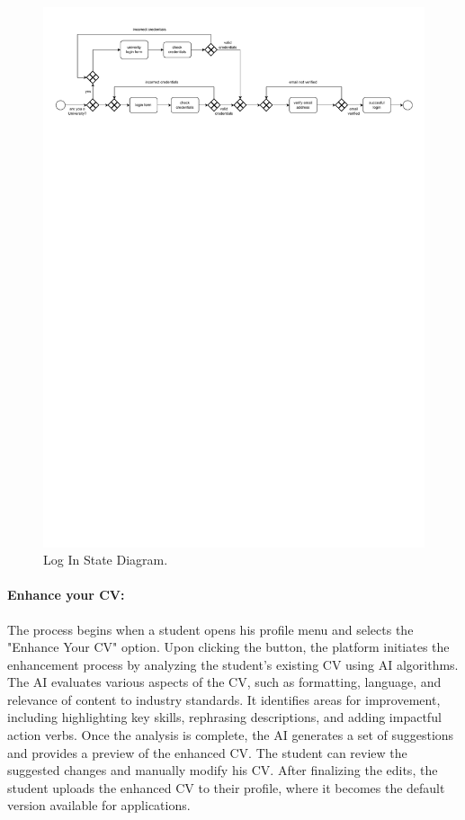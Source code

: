 \begin{figure}[H]
    \begin{center}
        \includegraphics[width=\linewidth]{Images/StateDiagram/Login.pdf}
        \caption{Log In State Diagram.}
        \label{fig:log_in_state_diag}%
    \end{center}
\end{figure}

\paragraph{Enhance your CV:} The process begins when a student opens his
  profile menu and selects the "Enhance Your CV" option. Upon clicking
  the button, the platform initiates the enhancement process by
  analyzing the student's existing CV using AI algorithms. The AI
  evaluates various aspects of the CV, such as formatting, language, and
  relevance of content to industry standards. It identifies areas for
  improvement, including highlighting key skills, rephrasing
  descriptions, and adding impactful action verbs. Once the analysis is
  complete, the AI generates a set of suggestions and provides a preview
  of the enhanced CV. The student can review the suggested changes and
  manually modify his CV. After finalizing the edits, the student
  uploads the enhanced CV to their profile, where it becomes the default
  version available for applications.

